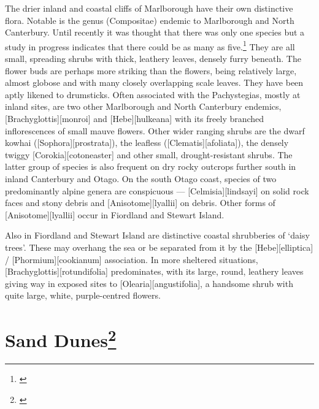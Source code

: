 The drier inland and coastal cliffs of Marlborough have their own distinctive flora.
Notable is the genus  (Compositae) endemic to Marlborough and North Canterbury.
Until recently it was thought that there was only one species but a study in progress indicates that there could be as many as five.\footnote{\cite{molloy1980taxonomy}}
They are all small, spreading shrubs with thick, leathery leaves, densely furry beneath.
The flower buds are perhaps more striking than the flowers, being relatively large, almost globose and with many closely overlapping scale leaves.
They have been aptly likened to drumsticks.
Often associated with the Pachystegias, mostly at inland sites, are two other Marlborough and North Canterbury endemics, [Brachyglottis][monroi] and [Hebe][hulkeana] with its freely branched inflorescences of small mauve flowers.
Other wider ranging shrubs are the dwarf kowhai ([Sophora][prostrata]), the leafless  ([Clematis][afoliata]), the densely twiggy [Corokia][cotoneaster] and other small, drought-resistant shrubs.
The latter group of species is also frequent on dry rocky outcrops further south in inland Canterbury and Otago.
On the south Otago coast, species of two predominantly alpine genera are conspicuous --- [Celmisia][lindsayi] on solid rock faces and stony debris and [Anisotome][lyallii] on debris.
Other forms of [Anisotome][lyallii] occur in Fiordland and Stewart Island.

Also in Fiordland and Stewart Island are distinctive coastal shrubberies of `daisy trees'.
These may overhang the sea or be separated from it by the [Hebe][elliptica] / [Phormium][cookianum] association.
In more sheltered situations, [Brachyglottis][rotundifolia] predominates, with its large, round, leathery leaves giving way in exposed sites to [Olearia][angustifolia], a handsome shrub with quite large, white, purple-centred flowers.

\section[Sand Dunes]{Sand Dunes\thinspace\footnote{\cite{moore1963plants}}}

